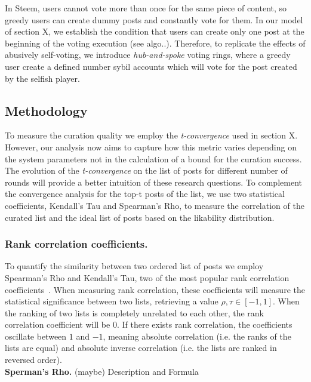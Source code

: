  In Steem, users cannot vote more than once for the same piece of content, so greedy users can create dummy posts and constantly vote for them.
In our model of section X, we establish the condition that users can create only one post at the beginning of the voting execution (see algo..).
 Therefore, to replicate the effects of abusively self-voting, we introduce \textit{hub-and-spoke} voting rings, where a greedy user create a defined number sybil accounts which will vote for the post created by the selfish player.


\subsection{Methodology}

To measure the curation quality we employ the \textit{t-convergence} used in section X. However, our analysis now aims to capture how this metric varies depending on the system parameters not in the calculation of a bound for the curation success.
The evolution of the \textit{t-convergence} on the list of posts for different number of rounds will provide a better intuition of these research questions.
To complement the convergence analysis for the top-t posts of the list, we use two statistical coefficients, Kendall's Tau and Spearman's Rho, to measure the correlation of the curated list and the ideal list of posts based on the likability distribution.

\subsubsection*{Rank correlation coefficients.}

To quantify the similarity between two ordered list of posts we employ Spearman's Rho and Kendall's Tau, two of the most popular rank correlation coefficients~\cite{kendall1955rank}.
When measuring rank correlation, these coefficients will measure the statistical significance between two lists, retrieving a value $\rho,\tau \in [-1 , 1]$. 
When the ranking of two lists is completely unrelated to each other, the rank correlation coefficient will be $0$. 
If there exists rank correlation, the coefficients oscillate between $1$ and $-1$, meaning absolute correlation (i.e. the ranks of the lists are equal) and absolute inverse correlation (i.e. the lists are ranked in reversed order).\\

\textbf{Sperman's Rho.} (maybe) Description and Formula

